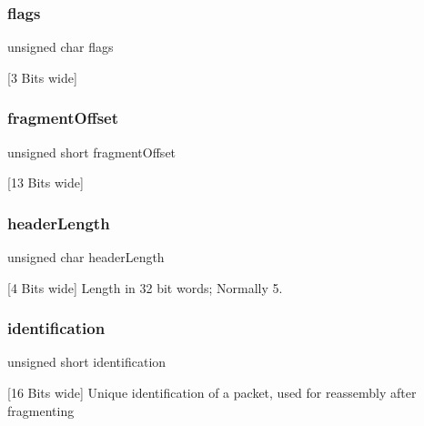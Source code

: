 \subsubsection{\texorpdfstring{flags}{flags}}
{\footnotesize\ttfamily unsigned char flags}



\mbox{[}3 Bits wide\mbox{]} 

\mbox{\label{structipv4_header___a0b5fddb65b6184b1060e641eec5afda0}} 
\subsubsection{\texorpdfstring{fragmentOffset}{fragmentOffset}}
{\footnotesize\ttfamily unsigned short fragment\+Offset}



\mbox{[}13 Bits wide\mbox{]} 

\mbox{\label{structipv4_header___af7e29b8f60e20e05bca935da9d1fb98c}} 
\subsubsection{\texorpdfstring{headerLength}{headerLength}}
{\footnotesize\ttfamily unsigned char header\+Length}



\mbox{[}4 Bits wide\mbox{]} Length in 32 bit words; Normally 5. 

\mbox{\label{structipv4_header___a44335dee0f0de11240d5e328cd2f2adb}} 
\subsubsection{\texorpdfstring{identification}{identification}}
{\footnotesize\ttfamily unsigned short identification}



\mbox{[}16 Bits wide\mbox{]} Unique identification of a packet, used for reassembly after fragmenting 

